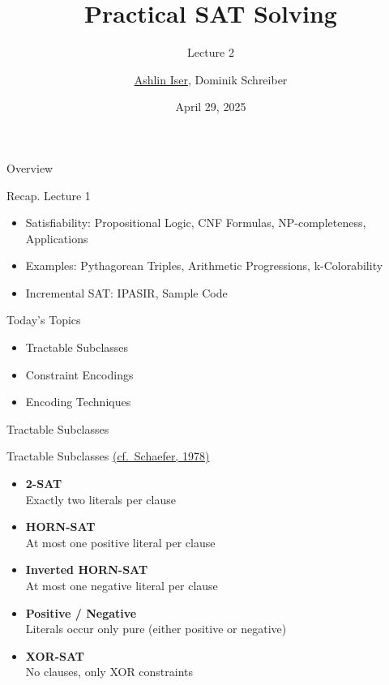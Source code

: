 \documentclass[t]{sdqbeamer}
\title{Practical SAT Solving}
\subtitle{Lecture 2 \unimp{\normalfont --  Tractable Subclasses, Encodings}}
\author{\underline{Ashlin Iser}, Dominik Schreiber}
\date{April 29, 2025}
\begin{document}
\begin{frame}[title white horizontal, picture=logos/blender-render, kitlogo=rgb]
	\titlepage
\end{frame}

\begin{frame}{Overview}
	\begin{block}{Recap. Lecture 1}
		\begin{itemize}\setlength{\itemsep}{1em}
			\item Satisfiability: Propositional Logic, CNF Formulas, NP-completeness, Applications
			\item Examples: Pythagorean Triples, Arithmetic Progressions, k-Colorability
			\item Incremental SAT: IPASIR, Sample Code
		\end{itemize}
	\end{block}
	\begin{block}{Today's Topics}
		\begin{itemize}\setlength{\itemsep}{1em}
			\item Tractable Subclasses
			\item Constraint Encodings
			\item Encoding Techniques
		\end{itemize}
	\end{block}
\end{frame}

\begin{frame}{Tractable Subclasses}
\pause
\begin{block}{Tractable Subclasses \href{https://doi.org/10.1145/800133.804350}{(cf.~Schaefer, 1978)}}
	\begin{itemize}\setlength{\itemsep}{1em}
		\item \textbf{2-SAT}\\Exactly two literals per clause
		\item \textbf{HORN-SAT}\\At most one positive literal per clause
		\item \textbf{Inverted HORN-SAT}\\At most one negative literal per clause
		\item \textbf{Positive / Negative}\\Literals occur only pure (either positive or negative)
		\item \textbf{XOR-SAT}\\No clauses, only XOR constraints
	\end{itemize}
\end{block}
\end{frame}
\end{document}
